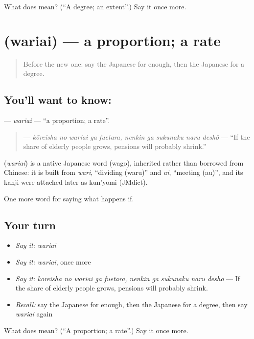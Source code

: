\begin{tcolorbox}[breakable,colback=teal!4,colframe=teal!35!black,title={Before you move on}]
What does  mean? (\textquotedblleft{}A degree; an extent\textquotedblright{}.) Say it once more.
\end{tcolorbox}
\section[\texorpdfstring{\ja{わりあい} (wariai)}{わりあい (wariai)}]{ (wariai) — a proportion; a rate}

\label{lesson:JA-C367-wariai}



\begin{quote}
Before the new one: say the Japanese for enough, then the Japanese for a degree.
\end{quote}

\subsection*{You'll want to know: }
\textbf{} — \emph{wariai} — \textquotedblleft{}a proportion; a rate\textquotedblright{}.

\begin{quote}
\textbf{    } — \emph{kōreisha no wariai ga fuetara, nenkin ga sukunaku naru deshō} — \textquotedblleft{}If the share of elderly people grows, pensions will probably shrink.\textquotedblright{}
\end{quote}

\begin{cousinweb}
\textbf{} (\emph{wariai}) is a native Japanese word (wago), inherited rather than borrowed from Chinese: it is built from \emph{wari}, \textquotedblleft{}dividing (waru)\textquotedblright{} and \emph{ai}, \textquotedblleft{}meeting (au)\textquotedblright{}, and its kanji were attached later as kun'yomi (JMdict).
\end{cousinweb}

\begin{grammarlens}[title={What you've built}]
One more word for saying what happens if.
\end{grammarlens}

\subsection*{Your turn}
\begin{itemize}
\raggedright
  \item \emph{Say it:} \emph{wariai}
  \item \emph{Say it:} \emph{wariai}, once more
  \item \emph{Say it:} \emph{kōreisha no wariai ga fuetara, nenkin ga sukunaku naru deshō} — If the share of elderly people grows, pensions will probably shrink.
  \item \emph{Recall:} say the Japanese for enough, then the Japanese for a degree, then say \emph{wariai} again
\end{itemize}

\begin{tcolorbox}[breakable,colback=teal!4,colframe=teal!35!black,title={Before you move on}]
What does  mean? (\textquotedblleft{}A proportion; a rate\textquotedblright{}.) Say it once more.
\end{tcolorbox}

